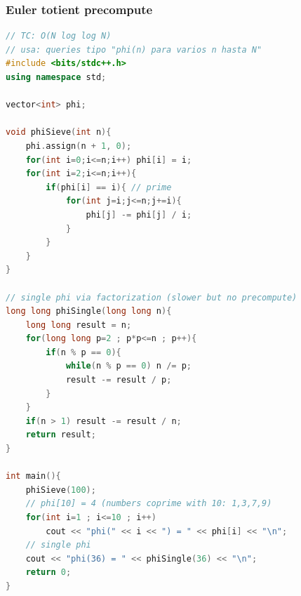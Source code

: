 \subsubsection{Euler totient precompute}
\begin{lstlisting}[style=mystyle, language=C++]
// TC: O(N log log N)
// usa: queries tipo "phi(n) para varios n hasta N"
#include <bits/stdc++.h>
using namespace std;

vector<int> phi;

void phiSieve(int n){
	phi.assign(n + 1, 0);
	for(int i=0;i<=n;i++) phi[i] = i;
	for(int i=2;i<=n;i++){
		if(phi[i] == i){ // prime
			for(int j=i;j<=n;j+=i){
				phi[j] -= phi[j] / i;
			}
		}
	}
}

// single phi via factorization (slower but no precompute)
long long phiSingle(long long n){
	long long result = n;
	for(long long p=2 ; p*p<=n ; p++){
		if(n % p == 0){
			while(n % p == 0) n /= p;
			result -= result / p;
		}
	}
	if(n > 1) result -= result / n;
	return result;
}

int main(){
	phiSieve(100);
	// phi[10] = 4 (numbers coprime with 10: 1,3,7,9)
	for(int i=1 ; i<=10 ; i++) 
		cout << "phi(" << i << ") = " << phi[i] << "\n";
	// single phi
	cout << "phi(36) = " << phiSingle(36) << "\n";
	return 0;
}
\end{lstlisting}
